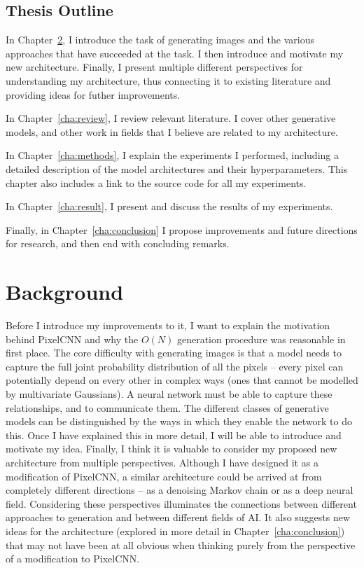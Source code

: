 \documentclass[11pt, a4paper, openany]{book}
\begin{document}
\section{Thesis Outline}
\label{sec:outline}
In Chapter~\ref{cha:background}, I introduce the task of generating images and the various approaches that have succeeded at the task. I then introduce and motivate my new architecture. Finally, I present multiple different perspectives for understanding my architecture, thus connecting it to existing literature and providing ideas for futher improvements.

In Chapter~\ref{cha:review}, I review relevant literature. I cover other generative models, and other work in fields that I believe are related to my architecture.

In Chapter~\ref{cha:methods}, I explain the experiments I performed, including a detailed description of the model architectures and their hyperparameters. This chapter also includes a link to the source code for all my experiments.

In Chapter~\ref{cha:result}, I present and discuss the results of my experiments.

Finally, in Chapter~\ref{cha:conclusion} I propose improvements and future directions for research, and then end with concluding remarks.

\chapter{Background}
\label{cha:background}
Before I introduce my improvements to it, I want to explain the motivation behind PixelCNN and why the $O(N)$ generation procedure was reasonable in first place. The core difficulty with generating images is that a model needs to capture the full joint probability distribution of all the pixels -- every pixel can potentially depend on every other in complex ways (ones that cannot be modelled by multivariate Gaussians). A neural network must be able to capture these relationships, and to communicate them. The different classes of generative models can be distinguished by the ways in which they enable the network to do this. Once I have explained this in more detail, I will be able to introduce and motivate my idea. Finally, I think it is valuable to consider my proposed new architecture from multiple perspectives. Although I have designed it as a modification of PixelCNN, a similar architecture could be arrived at from completely different directions -- as a denoising Markov chain or as a deep neural field. Considering these perspectives illuminates the connections between different approaches to generation and between different fields of AI. It also suggests new ideas for the architecture (explored in more detail in Chapter~\ref{cha:conclusion}) that may not have been at all obvious when thinking purely from the perspective of a modification to PixelCNN.
\end{document}
